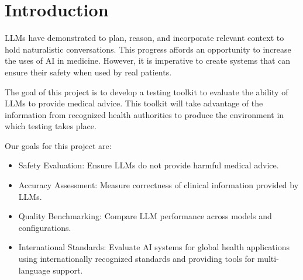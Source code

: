 
\section{Introduction}

LLMs have demonstrated to  plan, reason, and incorporate relevant context to hold naturalistic conversations. This progress affords an opportunity to increase the uses of AI in medicine.
However, it is imperative to create systems that can ensure their safety when used by real patients.

The goal of this project is to develop a testing toolkit to evaluate the ability of LLMs to provide medical advice. This toolkit will take advantage of the information from recognized health authorities to produce the environment in which testing takes place.

Our goals for this project are:
\begin{itemize}
\item Safety Evaluation: Ensure LLMs do not provide harmful medical advice.
\item Accuracy Assessment: Measure correctness of clinical information provided by LLMs.
\item Quality Benchmarking: Compare LLM performance across models and configurations.
\item International Standards: Evaluate AI systems for global health applications using internationally recognized standards and providing tools for multi-language support.
\end{itemize}

